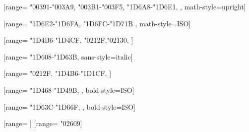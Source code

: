 \usepackage{polyglossia}

\usepackage{textcomp}

\usepackage{xltxtra}

\usepackage{unicode-math}


	[range={
		"00391-"003A9,		%
		"003B1-"003F5,		%
		"1D6A8-"1D6E1,	%
	}, math-style=upright]

	[range={
		"1D6E2-"1D6FA,		%
		"1D6FC-"1D71B		%
	}, math-style=ISO]

	[range={
		"1D4B6-"1D4CF,
		"0212F,"02130, %
	}]

	[range={
		"1D608-"1D63B},		%
		sans-style=italic]

	[range={
		"0212F,				%
		"1D4B6-"1D1CF,		%
	}]

	[range={
		"1D468-"1D49B,		%
	}, bold-style=ISO]

	[range={
		"1D63C-"1D66F,		%
	}, bold-style=ISO]

	[range={
		\mathbin}] %
	[range={
		"02609}] %


\usepackage{xeCJK}